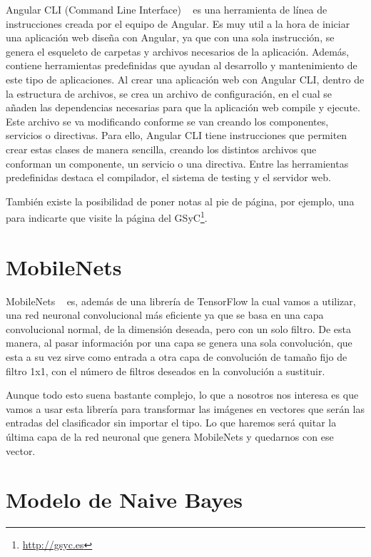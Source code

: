 \documentclass[a4paper, 12pt]{book}
\begin{document}
Angular CLI (Command Line Interface) ~\cite{articulobayes} es una herramienta de línea de instrucciones creada por el equipo de Angular. Es muy util a la hora de iniciar una aplicación web diseña con Angular, ya que con una sola instrucción, se genera el esqueleto de carpetas y archivos necesarios de la aplicación. Además, contiene herramientas predefinidas que ayudan al desarrollo y mantenimiento de este tipo de aplicaciones. Al crear una aplicación web con Angular CLI, dentro de la estructura de archivos, se crea un archivo de configuración, en el cual se añaden las dependencias necesarias para que la aplicación web compile y ejecute. Este archivo se va modificando conforme se van creando los componentes, servicios o directivas. Para ello, Angular CLI tiene instrucciones que permiten crear estas clases de manera sencilla, creando los distintos archivos que conforman un componente, un servicio o una directiva. Entre las herramientas predefinidas destaca el compilador, el sistema de testing y el servidor web.


También existe la posibilidad de poner notas al pie de página, por ejemplo, una para indicarte que visite la página del GSyC\footnote{\url{http://gsyc.es}}.

\section{MobileNets} 
\label{sec:mobilenets}

MobileNets ~\cite{mobilenets} es, además de una librería de TensorFlow la cual vamos a utilizar, una red neuronal convolucional más eficiente ya que se basa en una capa convolucional normal, de la dimensión deseada, pero con un solo filtro. De esta manera, al pasar información por una capa se genera una sola convolución, que esta a su vez sirve como entrada a otra capa de convolución de tamaño fijo de filtro 1x1, con el número de filtros deseados en la convolución a sustituir.

Aunque todo esto suena bastante complejo, lo que a nosotros nos interesa es que vamos a usar esta librería para transformar las imágenes en vectores que serán las entradas del clasificador sin importar el tipo. Lo que haremos será quitar la última capa de la red neuronal que genera MobileNets y quedarnos con ese vector.

\section{Modelo de Naive Bayes} 
\label{sec:modelobayes}
\end{document}
